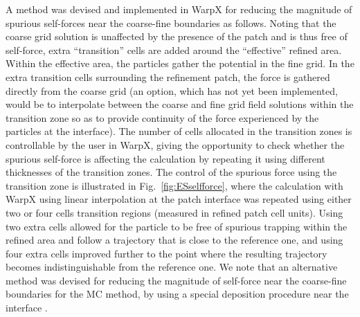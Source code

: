 A method was devised and implemented in WarpX for reducing the magnitude of spurious self-forces near the coarse-fine boundaries as follows. Noting that the coarse grid solution is unaffected by the presence of the patch and is thus free of self-force, extra ``transition'' cells  are added around the ``effective'' refined area.
Within the effective area, the particles gather the potential in the fine grid. In the extra transition cells surrounding the refinement patch, the force is gathered directly from the coarse grid (an option, which has not yet been implemented, would be to interpolate between the coarse and fine grid field solutions within the transition zone so as to provide continuity of the force experienced by the particles at the interface). The number of cells allocated in the transition zones is controllable by the user in WarpX, giving the opportunity to check whether the spurious self-force is affecting the calculation by repeating it using different thicknesses of the transition zones. The control of the spurious force using the transition zone is illustrated in Fig.~\ref{fig:ESselfforce}, where the calculation with WarpX using linear interpolation at the patch interface was repeated using either two or four cells transition regions (measured in refined patch cell units). Using two extra cells allowed for the particle to be free of spurious trapping within the refined area and follow a trajectory that is close to the reference one, and using four extra cells improved further to the point where the resulting trajectory becomes indistinguishable from the reference one.
We note that an alternative method was devised for reducing the magnitude of self-force near the coarse-fine boundaries for the MC method, by using a special deposition procedure near the interface \cite{Colellajcp2010}.


